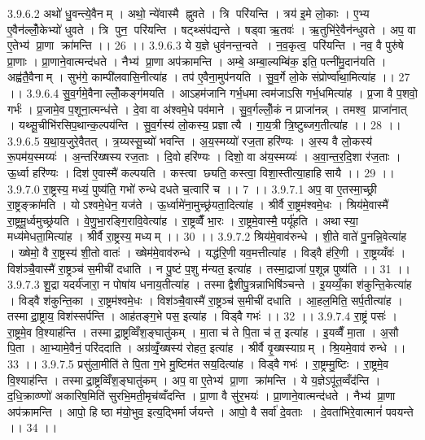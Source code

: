 3.9.6.2
अथो॑ धु॒वन्त्ये॒वैनम् । अथो॒ न्ये॑वास्मै ह्नुवते । त्रि परि॑यन्ति । त्रय॑ इ॒मे लो॒काः । ए॒भ्य ए॒वैन॑ल्लोँ॒केभ्यो॑ धुवते । त्रि पुन॒ परि॑यन्ति । षट्थ्संप॑द्यन्ते । षड्वा ऋ॒तवः॑ । ऋ॒तुभि॑रे॒वैन॑न्धुवते । अप॒ वा ए॒तेभ्य॑ प्रा॒णा क्रा॑मन्ति ।। 26 ।।
3.9.6.3
ये य॒ज्ञे धुव॑नन्त॒न्वते । न॒व॒कृत्व॒ परि॑यन्ति । नव॒ वै पुरु॑षे प्रा॒णाः । प्रा॒णाने॒वात्मन्द॑धते । नैभ्य॑ प्रा॒णा अप॑क्रामन्ति । अम्बे॒ अम्बा॒ल्यम्बि॑क॒ इति॒ पत्नी॑मु॒दान॑यति । अह्व॑तै॒वैनाम् । सुभ॑गे॒ काम्पी॑लवासि॒नीत्या॑ह । तप॑ ए॒वैना॒मुप॑नयति । सु॒व॒र्गे लो॒के संप्रोर्ण्वा॑था॒मित्या॑ह ।। 27 ।।
3.9.6.4
सु॒व॒र्गमे॒वैनाल्लोँ॒कङ्ग॑मयति । आऽहम॑जानि गर्भ॒धमा त्वम॑जाऽसि गर्भ॒धमित्या॑ह । प्र॒जा वै प॒शवो॒ गर्भः॑ । प्र॒जामे॒व प॒शूना॒त्मन्ध॑त्ते । दे॒वा वा अ॑श्वमे॒धे पव॑माने । सु॒व॒र्गल्लोँ॒कं न प्राजा॑नन्न् । तमश्व॒ प्राजा॑नात् । यथ्सू॒चीभि॑रसिप॒थान्क॒ल्पय॑न्ति । सु॒व॒र्गस्य॑ लो॒कस्य॒ प्रज्ञात्यै । गा॒य॒त्री त्रि॒ष्टुब्जग॒तीत्या॑ह ।। 28 ।।
3.9.6.5
य॒था॒य॒जुरे॒वैतत् । त्र॒य्यस्सू॒च्यो॑ भवन्ति । अ॒य॒स्मय्यो॑ रज॒ता हरि॑ण्यः । अ॒स्य वै लो॒कस्य॑ रू॒पम॑य॒स्मय्यः॑ । अ॒न्तरि॑ख्षस्य रज॒ताः । दि॒वो हरि॑ण्यः । दिशो॒ वा अ॑य॒स्मय्यः॑ । अ॒वा॒न्त॒र॒दि॒शा र॑ज॒ताः । ऊ॒र्ध्वा हरि॑ण्यः । दिश॑ ए॒वास्मै॑ कल्पयति । कस्त्वा छ्यति॒ कस्त्वा॒ विशा॒स्तीत्या॒हाहि॑सायै ।। 29 ।।
3.9.7.0
रा॒ष्ट्रस्य॒ मध्यं॒ पुष्य॑ति॒ गभो॑ रुन्धे दधते च॒त्वारि॑ च ।। 7 ।।
3.9.7.1
अप॒ वा ए॒तस्मा॒च्छ्री रा॒ष्ट्रङ्क्रा॑मति । योऽश्वमे॒धेन॒ यज॑ते । ऊ॒र्ध्वामे॑ना॒मुच्छ्र॑यता॒दित्या॑ह । श्रीर्वै रा॒ष्ट्रम॑श्वमे॒धः । श्रिय॑मे॒वास्मै॑ रा॒ष्ट्रमू॒र्ध्वमुच्छ्र॑यति । वे॒णु॒भा॒रङ्गि॒रावि॒वेत्या॑ह । रा॒ष्ट्रव्वैँ भा॒रः । रा॒ष्ट्रमे॒वास्मै॒ पर्यू॑हति । अथास्या॒ मध्य॑मेधता॒मित्या॑ह । श्रीर्वै रा॒ष्ट्रस्य॒ मध्यम् ।। 30 ।।
3.9.7.2
श्रिय॑मे॒वाव॑रुन्धे । शी॒ते वाते॑ पु॒नन्नि॒वेत्या॑ह । ख्षेमो॒ वै रा॒ष्ट्रस्य॑ शी॒तो वातः॑ । ख्षेम॑मे॒वाव॑रुन्धे । यद्ध॑रि॒णी यव॒मत्तीत्या॑ह । विड्वै ह॑रि॒णी । रा॒ष्ट्रय्यँवः॑ । विश॑ञ्चै॒वास्मै॑ रा॒ष्ट्रञ्च॑ स॒मीची॑ दधाति । न पु॒ष्टं प॒शु म॑न्यत॒ इत्या॑ह । तस्मा॒द्राजा॑ प॒शून्न पुष्य॑ति ।। 31 ।।
3.9.7.3
शू॒द्रा यदर्य॑जारा॒ न पोषा॑य धनाय॒तीत्या॑ह । तस्माद्वैशीपु॒त्रन्नाभिषि॑ञ्चन्ते । इ॒यय्यँ॒का श॑कुन्ति॒केत्या॑ह । विड्वै श॑कुन्ति॒का । रा॒ष्ट्रम॑श्वमे॒धः । विश॑ञ्चै॒वास्मै॑ रा॒ष्ट्रञ्च॑ स॒मीची॑ दधाति । आ॒हल॒मिति॒ सर्प॒तीत्या॑ह । तस्माद्रा॒ष्ट्राय॒ विश॑स्सर्पन्ति । आह॑तङ्ग॒भे पस॒ इत्या॑ह । विड्वै गभः॑ ।। 32 ।।
3.9.7.4
रा॒ष्ट्रं पसः॑ । रा॒ष्ट्रमे॒व वि॒श्याह॑न्ति । तस्माद्रा॒ष्ट्रव्विँश॒ङ्घातु॑कम् । मा॒ता च॑ ते पि॒ता च॑ त॒ इत्या॑ह । इ॒यव्वैँ मा॒ता । अ॒सौ पि॒ता । आ॒भ्यामे॒वैनं॒ परि॑ददाति । अग्र॑व्वृँ॒ख्षस्य॑ रोहत॒ इत्या॑ह । श्रीर्वै वृ॒ख्षस्याग्रम् । श्रि॒यमे॒वाव॑ रुन्धे ।। 33 ।।
3.9.7.5
प्रसु॑ला॒मीति॑ ते पि॒ता ग॒भे मु॒ष्टिम॑तसय॒दित्या॑ह । विड्वै गभः॑ । रा॒ष्ट्रम्मु॒ष्टिः । रा॒ष्ट्रमे॒व वि॒श्याह॑न्ति । तस्माद्रा॒ष्ट्रव्विँश॒ङ्घातु॑कम् । अप॒ वा ए॒तेभ्य॑ प्रा॒णा क्रा॑मन्ति । ये य॒ज्ञेऽपू॑त॒व्वँद॑न्ति । द॒धि॒क्राव्ण्णो॑ अकारिष॒मिति॑ सुरभि॒मती॒मृच॑व्वँदन्ति । प्रा॒णा वै सु॑र॒भयः॑ । प्रा॒णाने॒वात्मन्द॑धते । नैभ्य॑ प्रा॒णा अप॑क्रामन्ति । आपो॒ हि ष्ठा म॑यो॒भुव॒ इत्य॒द्भिर्मार्जयन्ते । आपो॒ वै सर्वा॑ दे॒वताः । दे॒वता॑भिरे॒वात्मानं॑ पवयन्ते ।। 34 ।।
